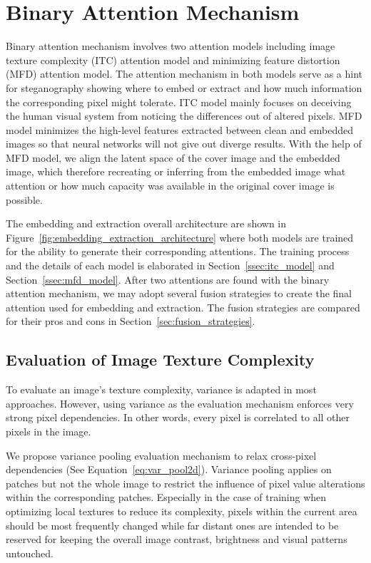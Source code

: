 \section{Binary Attention Mechanism}

Binary attention mechanism involves two attention models including image texture complexity (ITC) attention model and minimizing feature distortion (MFD) attention model. The attention mechanism in both models serve as a hint for steganography showing where to embed or extract and how much information the corresponding pixel might tolerate. ITC model mainly focuses on deceiving the human visual system from noticing the differences out of altered pixels. MFD model minimizes the high-level features extracted between clean and embedded images so that neural networks will not give out diverge results. With the help of MFD model, we align the latent space of the cover image and the embedded image, which therefore recreating or inferring from the embedded image what attention or how much capacity was available in the original cover image is possible.

The embedding and extraction overall architecture are shown in Figure~\ref{fig:embedding_extraction_architecture} where both models are trained for the ability to generate their corresponding attentions. The training process and the details of each model is elaborated in Section~\ref{ssec:itc_model} and Section~\ref{ssec:mfd_model}. After two attentions are found with the binary attention mechanism, we may adopt several fusion strategies to create the final attention used for embedding and extraction. The fusion strategies are compared for their pros and cons in Section~\ref{sec:fusion_strategies}.

\figureEmbeddingExtractionArchitecture%

\subsection{Evaluation of Image Texture Complexity}

To evaluate an image's texture complexity, variance is adapted in most approaches. However, using variance as the evaluation mechanism enforces very strong pixel dependencies. In other words, every pixel is correlated to all other pixels in the image.

We propose variance pooling evaluation mechanism to relax cross-pixel dependencies (See Equation~\ref{eq:var_pool2d}). Variance pooling applies on patches but not the whole image to restrict the influence of pixel value alterations within the corresponding patches. Especially in the case of training when optimizing local textures to reduce its complexity, pixels within the current area should be most frequently changed while far distant ones are intended to be reserved for keeping the overall image contrast, brightness and visual patterns untouched.

